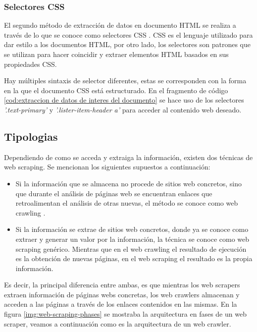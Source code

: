 \subsubsection{Selectores CSS}
\label{subsubsec:selectores CSS}

El segundo método de extracción de datos en documento HTML se realiza a través de lo que se conoce como
selectores CSS \cite{css-selectors-w3c}. CSS es el lenguaje utilizado para dar estilo a los documentos
HTML, por otro lado, los selectores son patrones que se utilizan para hacer coincidir y extraer elementos
HTML basados en sus propiedades CSS.

Hay múltiples sintaxis de selector diferentes, estas se corresponden con la forma en la que el documento
CSS está estructurado. En el fragmento de código \ref{cod:extraccion de datos de interes del documento}
se hace uso de los selectores \emph{'.text-primary'} y \emph{'.lister-item-header a'} para acceder al
contenido web deseado.

\subsection{Tipologias}
\label{subsec:tipologias}
Dependiendo de como se acceda y extraiga la información, existen dos técnicas de web scraping. Se mencionan
los siguientes supuestos a continuación:

\begin{itemize}
\item Si la información que se almacena no procede de sitios web concretos, sino que durante el análisis
de páginas web se encuentran enlaces que retroalimentan el análisis de otras nuevas, el método se conoce
como web crawling \cite{web-crawling-wikipedia}.

\item Si la información se extrae de sitios web concretos, donde ya se conoce como extraer y generar un
valor por la información, la técnica se conoce como web scraping genérico. Mientras que en el web crawling
el resultado de ejecución es la obtención de nuevas páginas, en el web scraping el resultado es la propia
información.
\end{itemize}

Es decir, la principal diferencia entre ambas, es que mientras los web scrapers extraen información de
páginas webs concretas, los web crawlers almacenan y acceden a las páginas a través de los enlaces
contenidos en las mismas. En la figura \ref{img:web-scraping-phases} se mostraba la arquitectura en fases
de un web scraper, veamos a continuación como es la arquitectura de un web crawler.

